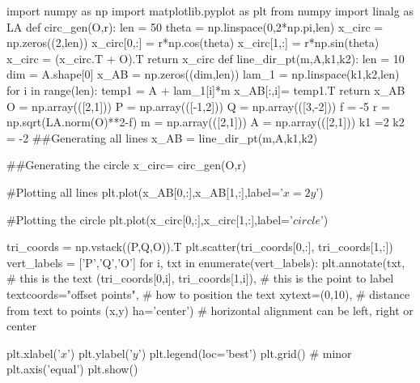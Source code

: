 import numpy as np
import matplotlib.pyplot as plt
from numpy import linalg as LA
def circ_gen(O,r):
	len = 50
	theta = np.linspace(0,2*np.pi,len)
	x_circ = np.zeros((2,len))
	x_circ[0,:] = r*np.cos(theta)
	x_circ[1,:] = r*np.sin(theta)
	x_circ = (x_circ.T + O).T
	return x_circ
def line_dir_pt(m,A,k1,k2):
  len = 10
  dim = A.shape[0]
  x_AB = np.zeros((dim,len))
  lam_1 = np.linspace(k1,k2,len)
  for i in range(len):
    temp1 = A + lam_1[i]*m
    x_AB[:,i]= temp1.T
  return x_AB
O = np.array(([2,1]))
P = np.array(([-1,2]))
Q = np.array(([3,-2]))
f = -5
r = np.sqrt(LA.norm(O)**2-f)
m = np.array(([2,1]))
A = np.array(([2,1]))
k1 =2
k2 = -2
##Generating all lines
x_AB = line_dir_pt(m,A,k1,k2)

##Generating the circle
x_circ= circ_gen(O,r)

#Plotting all lines
plt.plot(x_AB[0,:],x_AB[1,:],label='$x=2y$')

#Plotting the circle
plt.plot(x_circ[0,:],x_circ[1,:],label='$circle$')


tri_coords = np.vstack((P,Q,O)).T
plt.scatter(tri_coords[0,:], tri_coords[1,:])
vert_labels = ['P','Q','O']
for i, txt in enumerate(vert_labels):
    plt.annotate(txt, # this is the text
                 (tri_coords[0,i], tri_coords[1,i]), # this is the point to label
                 textcoords="offset points", # how to position the text
                 xytext=(0,10), # distance from text to points (x,y)
                 ha='center') # horizontal alignment can be left, right or center

plt.xlabel('$x$')
plt.ylabel('$y$')
plt.legend(loc='best')
plt.grid() # minor
plt.axis('equal')
plt.show()
